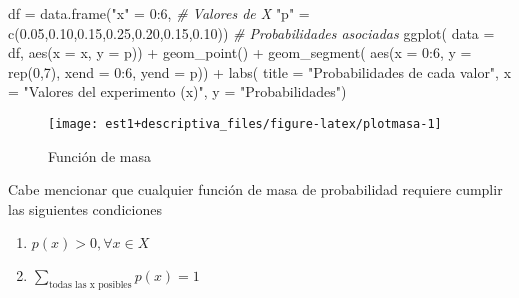 \documentclass[
]{book}
\newenvironment{Shaded}{\begin{snugshade}}{\end{snugshade}}
\newcommand{\AttributeTok}[1]{\textcolor[rgb]{0.77,0.63,0.00}{#1}}
\newcommand{\CommentTok}[1]{\textcolor[rgb]{0.56,0.35,0.01}{\textit{#1}}}
\newcommand{\DecValTok}[1]{\textcolor[rgb]{0.00,0.00,0.81}{#1}}
\newcommand{\FloatTok}[1]{\textcolor[rgb]{0.00,0.00,0.81}{#1}}
\newcommand{\FunctionTok}[1]{\textcolor[rgb]{0.00,0.00,0.00}{#1}}
\newcommand{\NormalTok}[1]{#1}
\newcommand{\OtherTok}[1]{\textcolor[rgb]{0.56,0.35,0.01}{#1}}
\newcommand{\SpecialCharTok}[1]{\textcolor[rgb]{0.00,0.00,0.00}{#1}}
\newcommand{\StringTok}[1]{\textcolor[rgb]{0.31,0.60,0.02}{#1}}
\providecommand{\tightlist}{%
  \setlength{\itemsep}{0pt}\setlength{\parskip}{0pt}}
\theoremstyle{definition}
\theoremstyle{definition}
\theoremstyle{definition}
\theoremstyle{definition}
\theoremstyle{remark}
\begin{document}
\begin{Shaded}
\begin{Highlighting}[]
\NormalTok{df }\OtherTok{=} \FunctionTok{data.frame}\NormalTok{(}\StringTok{"x"} \OtherTok{=} \DecValTok{0}\SpecialCharTok{:}\DecValTok{6}\NormalTok{, }\CommentTok{\# Valores de X}
                \StringTok{"p"} \OtherTok{=} \FunctionTok{c}\NormalTok{(}\FloatTok{0.05}\NormalTok{,}\FloatTok{0.10}\NormalTok{,}\FloatTok{0.15}\NormalTok{,}\FloatTok{0.25}\NormalTok{,}\FloatTok{0.20}\NormalTok{,}\FloatTok{0.15}\NormalTok{,}\FloatTok{0.10}\NormalTok{)) }\CommentTok{\# Probabilidades asociadas}
\FunctionTok{ggplot}\NormalTok{(}
  \AttributeTok{data =}\NormalTok{ df, }
  \FunctionTok{aes}\NormalTok{(}\AttributeTok{x =}\NormalTok{ x,}
      \AttributeTok{y =}\NormalTok{ p)) }\SpecialCharTok{+}
  \FunctionTok{geom\_point}\NormalTok{() }\SpecialCharTok{+}
  \FunctionTok{geom\_segment}\NormalTok{(}
    \FunctionTok{aes}\NormalTok{(}\AttributeTok{x =} \DecValTok{0}\SpecialCharTok{:}\DecValTok{6}\NormalTok{,}
        \AttributeTok{y =} \FunctionTok{rep}\NormalTok{(}\DecValTok{0}\NormalTok{,}\DecValTok{7}\NormalTok{),}
        \AttributeTok{xend =} \DecValTok{0}\SpecialCharTok{:}\DecValTok{6}\NormalTok{,}
        \AttributeTok{yend =}\NormalTok{ p)) }\SpecialCharTok{+}
  \FunctionTok{labs}\NormalTok{(}
    \AttributeTok{title =} \StringTok{"Probabilidades de cada valor"}\NormalTok{,}
    \AttributeTok{x =} \StringTok{"Valores del experimento (x)"}\NormalTok{,}
    \AttributeTok{y =} \StringTok{"Probabilidades"}\NormalTok{)}
\end{Highlighting}
\end{Shaded}

\begin{figure}

{\centering \texttt{[image: est1+descriptiva\_files/figure-latex/plotmasa-1]} 

}

\caption{Función de masa}\label{fig:plotmasa}
\end{figure}

Cabe mencionar que cualquier función de masa de probabilidad requiere cumplir las siguientes condiciones

\begin{enumerate}
\def\labelenumi{\arabic{enumi}.}
\tightlist
\item
  \(p(x) >0, \forall x \in X\)
\item
  \(\displaystyle\sum_{\text{todas las x posibles}} p(x) = 1\)
\end{enumerate}
\end{document}
